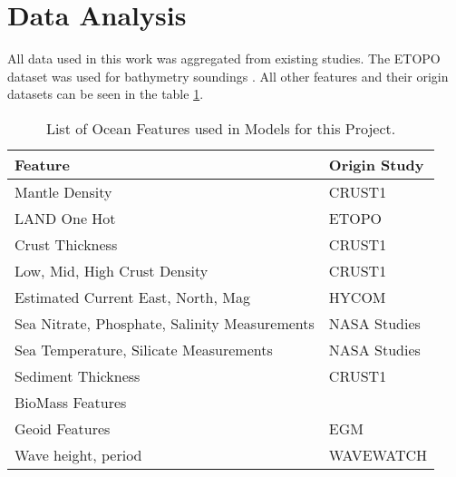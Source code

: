\section{Data Analysis}
\setlength{\parindent}{10ex}

All data used in this work was aggregated from existing studies.
The ETOPO dataset was used for bathymetry soundings \cite{national1988etopo}.
All other features and their origin datasets can be seen in the table \ref{table:FEATURE_LIST}. %

%

\begin{center}
    \begin{table}[htb]
        \begin{tabular}{ |p{} p{}| }
            \hline
                \textbf{Feature} & \textbf{Origin Study} \\
                \hline
                Mantle Density & CRUST1 \cite{laske2013update} \\
                LAND One Hot & ETOPO \cite{national1988etopo} \\
                Crust Thickness & CRUST1 \cite{laske2013update} \\
                Low, Mid, High Crust Density & CRUST1 \cite{laske2013update} \\
                Estimated Current East, North, Mag & HYCOM \cite{chassignet2009us} \\
                Sea Nitrate, Phosphate, Salinity Measurements & NASA Studies \cite{meissner2018salinity} \cite{parekh2005decoupling}  \\
                Sea Temperature, Silicate Measurements & NASA Studies \\
                Sediment Thickness & CRUST1 \cite{laske2013update} \\
                BioMass Features & \cite{wei2010global} \\
                Geoid Features & EGM \cite{pavlis2008earth} \\
                Wave height, period & WAVEWATCH \cite{tolman20072007} \\
            \hline
        \end{tabular}
        \label{table:FEATURE_LIST}
        \caption{List of Ocean Features used in Models for this Project.}
    \end{table}
\end{center}
